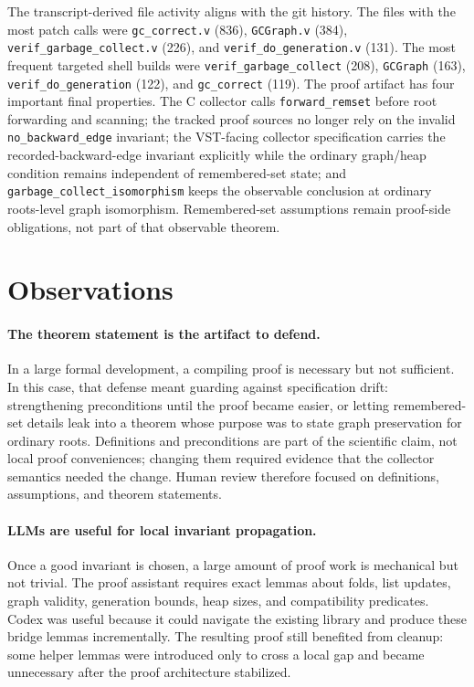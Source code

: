 \documentclass[acmsmall,nonacm]{acmart}
\newcommand{\VST}{VST}
\newcommand{\tus}{\_\allowbreak{}}
\begin{document}
The transcript-derived file activity aligns with the git history.  The files
with the most patch calls were \texttt{gc\tus correct.v} (836),
\texttt{GCGraph.v} (384), \texttt{verif\tus garbage\tus collect.v} (226), and
\texttt{verif\tus do\tus generation.v} (131).  The most frequent targeted shell
builds were \texttt{verif\tus garbage\tus collect} (208), \texttt{GCGraph}
(163), \texttt{verif\tus do\tus generation} (122), and \texttt{gc\tus correct}
(119).  The proof artifact has four important final properties.  The C collector
calls \texttt{forward\tus remset} before root forwarding and scanning; the
tracked proof sources no longer rely on the invalid
\texttt{no\tus backward\tus edge} invariant; the \VST{}-facing collector
specification carries the recorded-backward-edge invariant explicitly while the
ordinary graph/heap condition remains independent of remembered-set state; and
\texttt{garbage\tus collect\tus isomorphism} keeps the observable conclusion at
ordinary roots-level graph isomorphism.  Remembered-set assumptions remain
proof-side obligations, not part of that observable theorem.

\section{Observations}

\paragraph{The theorem statement is the artifact to defend.}
In a large formal development, a compiling proof is necessary but not sufficient.
In this case, that defense meant guarding against specification drift:
strengthening preconditions until the proof became easier, or letting
remembered-set details leak into a theorem whose purpose was to state graph
preservation for ordinary roots.  Definitions and preconditions are part of the
scientific claim, not local proof conveniences; changing them required evidence
that the collector semantics needed the change.  Human review therefore focused
on definitions, assumptions, and theorem statements.

\paragraph{LLMs are useful for local invariant propagation.}
Once a good invariant is chosen, a large amount of proof work is mechanical but
not trivial.  The proof assistant requires exact lemmas about folds, list
updates, graph validity, generation bounds, heap sizes, and compatibility
predicates.  Codex was useful because it could navigate the existing library and
produce these bridge lemmas incrementally.  The resulting proof still benefited
from cleanup: some helper lemmas were introduced only to cross a local gap and
became unnecessary after the proof architecture stabilized.
\end{document}
